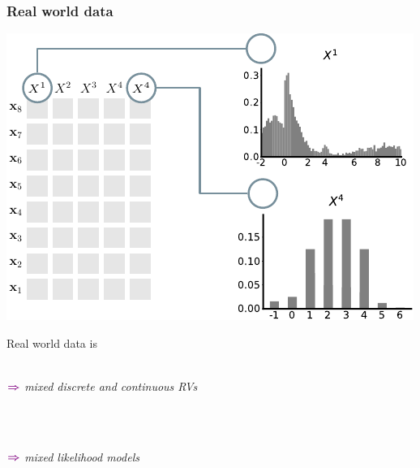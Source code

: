 \documentclass[xcolor={usenames,dvipsnames,svgnames}, compress, aspectratio=169, 11pt]{beamer}
\newcommand{\comment}[3][\small]{\begin{minipage}{1\linewidth}
          \raggedleft
          {
            $\color{violet}\boldsymbol\Rightarrow$
            #1
            {\emph{#2}}
          }
      \end{minipage}#3\\
}
\begin{document}
\begin{frame}[t, htt=bgrey2]
  \frametitle{Real world data}

  \large
  \begin{minipage}[t]{0.6\linewidth}
    \includegraphics[width=.99\linewidth]{figures/abda-hist-type}
  \end{minipage}\hfill\begin{minipage}[t]{0.3\linewidth}
    \vspace{-150pt}
    { Real world data is}\\[5pt]
    \\
    \comment[\normalsize]{mixed discrete and continuous RVs}{}\\
    \comment[\normalsize]{mixed likelihood models}{}\\
  \end{minipage}  
\end{frame}
\end{document}
